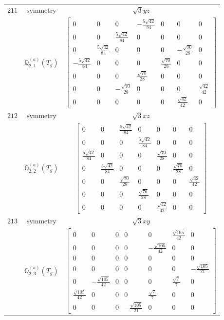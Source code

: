 \documentclass[fleqn,8pt,landscape]{jsarticle}
\begin{document}
\begin{longtable}{ccc}
$ 211 $ & $ \text{symmetry} $ & $ \sqrt{3} y z $ \\
$  $ & $ \mathbb{Q}_{2,1}^{(a)}(T_{g}) $ & $ \begin{bmatrix} 0 & 0 & 0 & - \frac{5 \sqrt{42}}{84} & 0 & 0 & 0 \\ 0 & 0 & \frac{5 \sqrt{42}}{84} & 0 & 0 & 0 & 0 \\ 0 & \frac{5 \sqrt{42}}{84} & 0 & 0 & 0 & - \frac{\sqrt{70}}{28} & 0 \\ - \frac{5 \sqrt{42}}{84} & 0 & 0 & 0 & \frac{\sqrt{70}}{28} & 0 & 0 \\ 0 & 0 & 0 & \frac{\sqrt{70}}{28} & 0 & 0 & 0 \\ 0 & 0 & - \frac{\sqrt{70}}{28} & 0 & 0 & 0 & \frac{\sqrt{42}}{42} \\ 0 & 0 & 0 & 0 & 0 & \frac{\sqrt{42}}{42} & 0 \end{bmatrix} $ \\ \hline
$ 212 $ & $ \text{symmetry} $ & $ \sqrt{3} x z $ \\
$  $ & $ \mathbb{Q}_{2,2}^{(a)}(T_{g}) $ & $ \begin{bmatrix} 0 & 0 & \frac{5 \sqrt{42}}{84} & 0 & 0 & 0 & 0 \\ 0 & 0 & 0 & \frac{5 \sqrt{42}}{84} & 0 & 0 & 0 \\ \frac{5 \sqrt{42}}{84} & 0 & 0 & 0 & \frac{\sqrt{70}}{28} & 0 & 0 \\ 0 & \frac{5 \sqrt{42}}{84} & 0 & 0 & 0 & \frac{\sqrt{70}}{28} & 0 \\ 0 & 0 & \frac{\sqrt{70}}{28} & 0 & 0 & 0 & \frac{\sqrt{42}}{42} \\ 0 & 0 & 0 & \frac{\sqrt{70}}{28} & 0 & 0 & 0 \\ 0 & 0 & 0 & 0 & \frac{\sqrt{42}}{42} & 0 & 0 \end{bmatrix} $ \\ \hline
$ 213 $ & $ \text{symmetry} $ & $ \sqrt{3} x y $ \\
$  $ & $ \mathbb{Q}_{2,3}^{(a)}(T_{g}) $ & $ \begin{bmatrix} 0 & 0 & 0 & 0 & 0 & \frac{\sqrt{105}}{42} & 0 \\ 0 & 0 & 0 & 0 & - \frac{\sqrt{105}}{42} & 0 & 0 \\ 0 & 0 & 0 & 0 & 0 & 0 & 0 \\ 0 & 0 & 0 & 0 & 0 & 0 & - \frac{\sqrt{105}}{21} \\ 0 & - \frac{\sqrt{105}}{42} & 0 & 0 & 0 & \frac{\sqrt{7}}{7} & 0 \\ \frac{\sqrt{105}}{42} & 0 & 0 & 0 & \frac{\sqrt{7}}{7} & 0 & 0 \\ 0 & 0 & 0 & - \frac{\sqrt{105}}{21} & 0 & 0 & 0 \end{bmatrix} $ \\ \hline

\end{longtable}
\end{document}
